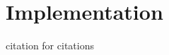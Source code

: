 \documentclass[a4paper]{report}
\begin{document}
\chapter{Implementation}


% 
%
% 
%
% 
%
% 
%
% 
%


\newpage
citation for citations\cite{Bengtsson1995}




\newpage



% 
\end{document}
